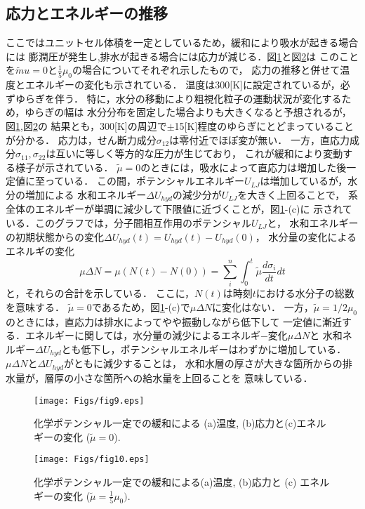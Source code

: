 \subsection{応力とエネルギーの推移}
ここではユニットセル体積を一定としているため，緩和により吸水が起きる場合には
膨潤圧が発生し,排水が起きる場合には応力が減じる．図\ref{fig:fig9}と図\ref{fig:fig10}は
このことを$\tilde mu=0$と$\frac{1}{5}\mu_0$の場合についてそれぞれ示したもので，
応力の推移と併せて温度とエネルギーの変化も示されている．
温度は300[K]に設定されているが，必ずゆらぎを伴う．
特に，水分の移動により粗視化粒子の運動状況が変化するため，ゆらぎの幅は
水分分布を固定した場合よりも大きくなると予想されるが，図\ref{fig:fig9},図\ref{fig:fig10}の
結果とも，300[K]の周辺で$\pm$15[K]程度のゆらぎにとどまっていることが分かる．
応力は，せん断力成分$\sigma_{12}$は零付近でほぼ変が無い．
一方，直応力成分$\sigma_{11},\sigma_{22}$は互いに等しく等方的な圧力が生じており，
これが緩和により変動する様子が示されている．
$\tilde \mu=0$のときには，吸水によって直応力は増加した後一定値に至っている．
この間，ポテンシャルエネルギー$U_{LJ}$は増加しているが，水分の増加による
水和エネルギー$\Delta U_{hyd}$の減少分が$U_{LJ}$を大きく上回ることで，
系全体のエネルギーが単調に減少して下限値に近づくことが，図\ref{fig:fig9}-(c)に
示されている．このグラフでは，分子間相互作用のポテンシャル$U_{LJ}$と，
水和エネルギーの初期状態からの変化$\Delta U_{hyd}(t)=U_{hyd}(t)-U_{hyd}(0)$，
水分量の変化によるエネルギの変化
\begin{equation}
	\mu \Delta N= \mu \left(N(t)-N(0) \right) = \sum_i^n \int_0^t \tilde \mu 
	\frac{d\sigma_i}{dt} dt
	\label{eqn:mu_dN}
\end{equation}
と，それらの合計を示している．
ここに，$N(t)$は時刻$t$における水分子の総数を意味する．
$\tilde \mu=0$であるため，図\ref{fig:fig9}-(c)で$\mu \Delta N$に変化はない．
%
一方，$\tilde \mu =1/2\mu_0$のときには，直応力は排水によってやや振動しながら低下して
一定値に漸近する．エネルギーに関しては，水分量の減少によるエネルギ−変化$\mu \Delta N$と
水和ネルギー$\Delta U_{hyd}$とも低下し，ポテンシャルエネルギーはわずかに増加している．
$\mu \Delta N$と$\Delta U_{hyd}$がともに減少することは，
水和水層の厚さが大きな箇所からの排水量が，層厚の小さな箇所への給水量を上回ることを
意味している．
\begin{figure}[h]
	\begin{center}
	\texttt{[image: Figs/fig9.eps]} 
	\end{center}
	\caption{
		化学ポテンシャル一定での緩和による
		(a)温度, (b)応力と(c)エネルギーの変化 ($\tilde \mu=0$).
	} 
	\label{fig:fig9}
\end{figure}
\begin{figure}[h]
	\begin{center}
	\texttt{[image: Figs/fig10.eps]} 
	\end{center}
	\caption{
		化学ポテンシャル一定での緩和による(a)温度, (b)応力と (c) エネルギーの変化
		($\tilde \mu =\frac{1}{5}\mu_0).$
	} 
	\label{fig:fig10}
\end{figure}
